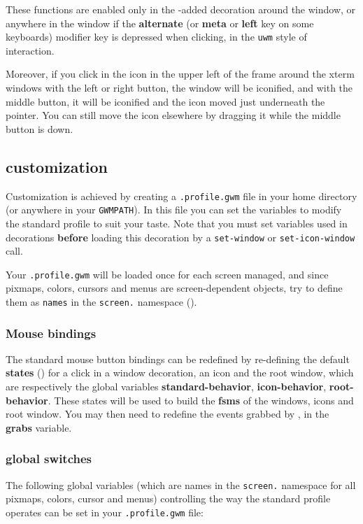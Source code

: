 These functions are enabled only in the {\GWM}-added decoration around the
window, or anywhere in the window if the {\bf alternate} (or {\bf meta} or
{\bf left} key on some keyboards) modifier key is depressed when clicking,
in the \verb"uwm" style of interaction.

Moreover, if you click in the icon in the upper left of the frame around the
xterm windows with the left or right button, the window will be iconified,
and with the middle button, it will be iconified and the icon moved just
underneath the pointer. You can still move the icon elsewhere by
dragging it while the middle button is down.

\subsection{customization}

Customization is achieved by creating a \verb".profile.gwm" file in
your home directory (or anywhere in your \verb"GWMPATH"). In this file
you can set the variables to modify the standard profile to suit your
taste. Note that you must set variables used in decorations {\bf
before} loading this decoration by a \verb"set-window" or
\verb"set-icon-window" call.

Your \verb".profile.gwm" will be loaded once for each screen
managed, and since pixmaps, colors, cursors and menus are screen-dependent
objects, try to define them as \verb"names" in the \verb"screen." namespace
().

\subsubsection{Mouse bindings}

The standard mouse button bindings can be redefined by re-defining the
default {\bf states} () for a
click in a window decoration, an icon and the root window, which are
respectively the global variables {\bf standard-behavior}, {\bf
icon-behavior}, {\bf root-behavior}. These states will be used to build the
{\bf fsms} of the windows, icons and root window. You may then need to
redefine the events grabbed by {\GWM}, in the {\bf grabs} variable.

\subsubsection{global switches}

The following global variables (which are names in the \verb"screen."
namespace for all pixmaps, colors, cursor and menus) controlling the way the
standard profile operates can be set in your \verb".profile.gwm" file:

